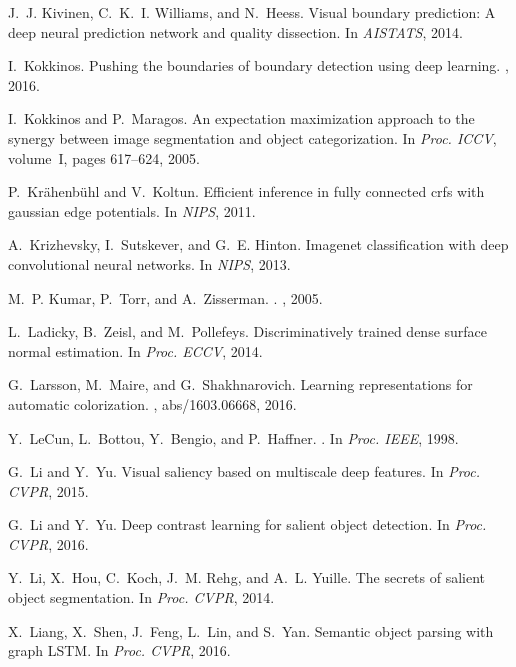 \documentclass[10pt,twocolumn,letterpaper]{article}
\begin{document}
\begin{thebibliography}{100}
	J.~J. Kivinen, C.~K.~I. Williams, and N.~Heess.
	\newblock Visual boundary prediction: {A} deep neural prediction network and
	quality dissection.
	\newblock In {\em AISTATS}, 2014.
	
	I.~Kokkinos.
	\newblock Pushing the boundaries of boundary detection using deep learning.
	, 2016.
	
	I.~Kokkinos and P.~Maragos.
	\newblock An expectation maximization approach to the synergy between image
	segmentation and object categorization.
	\newblock In {\em Proc. {ICCV}}, volume~I, pages 617--624, 2005.
	
	P.~Kr{\"a}henb{\"u}hl and V.~Koltun.
	\newblock Efficient inference in fully connected crfs with gaussian edge
	potentials.
	\newblock In {\em NIPS}, 2011.
	
	A.~Krizhevsky, I.~Sutskever, and G.~E. Hinton.
	\newblock Imagenet classification with deep convolutional neural networks.
	\newblock In {\em NIPS}, 2013.
	
	M.~P. Kumar, P.~Torr, and A.~Zisserman.
	.
	, 2005.
	
	L.~Ladicky, B.~Zeisl, and M.~Pollefeys.
	\newblock Discriminatively trained dense surface normal estimation.
	\newblock In {\em Proc. {ECCV}}, 2014.
	
	G.~Larsson, M.~Maire, and G.~Shakhnarovich.
	\newblock Learning representations for automatic colorization.
	, abs/1603.06668, 2016.
	
	Y.~LeCun, L.~Bottou, Y.~Bengio, and P.~Haffner.
	.
	\newblock In {\em Proc. IEEE}, 1998.
	
	G.~Li and Y.~Yu.
	\newblock Visual saliency based on multiscale deep features.
	\newblock In {\em Proc. {CVPR}}, 2015.
	
	G.~Li and Y.~Yu.
	\newblock Deep contrast learning for salient object detection.
	\newblock In {\em Proc. {CVPR}}, 2016.
	
	Y.~Li, X.~Hou, C.~Koch, J.~M. Rehg, and A.~L. Yuille.
	\newblock The secrets of salient object segmentation.
	\newblock In {\em Proc. {CVPR}}, 2014.
	
	X.~Liang, X.~Shen, J.~Feng, L.~Lin, and S.~Yan.
	\newblock Semantic object parsing with graph {LSTM}.
	\newblock In {\em Proc. {CVPR}}, 2016.
	

\end{thebibliography}
\end{document}
